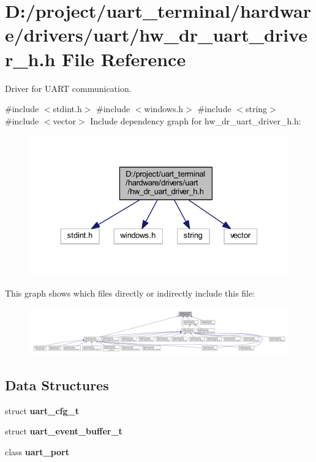 \section{D\+:/project/uart\+\_\+terminal/hardware/drivers/uart/hw\+\_\+dr\+\_\+uart\+\_\+driver\+\_\+h.h File Reference}
\label{hw__dr__uart__driver__h_8h}


Driver for U\+A\+RT communication.  


{\ttfamily \#include $<$stdint.\+h$>$}\newline
{\ttfamily \#include $<$windows.\+h$>$}\newline
{\ttfamily \#include $<$string$>$}\newline
{\ttfamily \#include $<$vector$>$}\newline
Include dependency graph for hw\+\_\+dr\+\_\+uart\+\_\+driver\+\_\+h.\+h\+:
\nopagebreak
\begin{figure}[H]
\begin{center}
\leavevmode
\includegraphics[width=330pt]{hw__dr__uart__driver__h_8h__incl}
\end{center}
\end{figure}
This graph shows which files directly or indirectly include this file\+:
\nopagebreak
\begin{figure}[H]
\begin{center}
\leavevmode
\includegraphics[width=350pt]{hw__dr__uart__driver__h_8h__dep__incl}
\end{center}
\end{figure}
\subsection*{Data Structures}
\begin{DoxyCompactItemize}
\item 
struct \textbf{ uart\+\_\+cfg\+\_\+t}
\item 
struct \textbf{ uart\+\_\+event\+\_\+buffer\+\_\+t}
\item 
class \textbf{ uart\+\_\+port}
\end{DoxyCompactItemize}
